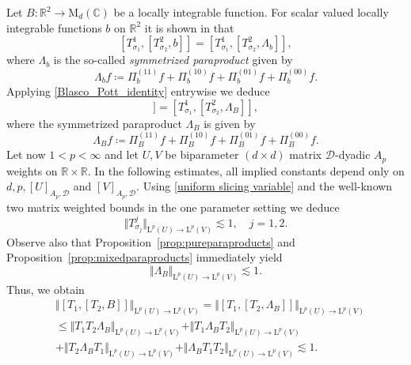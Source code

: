\documentclass{article}
\theoremstyle{definition}
\theoremstyle{remark}
\numberwithin{equation}{section}
\newcommand{\bfD}{\bm{\mathcal{D}}}
\newcommand{\reals}{\mathbb{R}}
\newcommand{\complex}{\mathbb{C}}
\newcommand{\Lp}[1]{\mathrm{L}^{#1}}
\newcommand{\1}{\mathbf{1}}
\begin{document}
    Let $B:\reals^{2}\to \mathrm{M}_{d}(\complex)$ be a locally integrable function. For scalar valued locally integrable functions $b$ on $\reals^2$ it is shown in \cite{Blasco_Pott_2005} that
    \begin{equation}
        \label{Blasco_Pott_identity}
        [T^1_{\sigma_1},[T^2_{\sigma_2},b]] = [T^1_{\sigma_1},[T^2_{\sigma_2},\Lambda_{b}]],
    \end{equation}
    where $\Lambda_{b}$ is the so-called \emph{symmetrized paraproduct} given by
    \begin{equation*}
        \Lambda_{b}f \coloneq  \Pi^{(11)}_{b}f+\Pi^{(10)}_{b}f+\Pi^{(01)}_{b}f+\Pi^{(00)}_{b}f.
    \end{equation*}
    Applying \eqref{Blasco_Pott_identity} entrywise we deduce
    \begin{equation*}
        [T^1_{\sigma_1},[T^2_{\sigma_2},B]] = [T^1_{\sigma_1},[T^2_{\sigma_2},\Lambda_{B}]],
    \end{equation*}
    where the symmetrized paraproduct $\Lambda_{B}$ is given by
    \begin{equation*}
        \Lambda_{B}f \coloneq  \Pi^{(11)}_{B}f+\Pi^{(10)}_{B}f+\Pi^{(01)}_{B}f+\Pi^{(00)}_{B}f.
    \end{equation*}
    Let now $1<p<\infty$ and let $U,V$ be biparameter $(d\times d)$ matrix $\bfD$-dyadic $A_p$ weights on $\reals\times\reals.$ In the following estimates, all implied constants depend only on $d,p,[U]_{A_p,\bfD}$ and $[V]_{A_p,\bfD}.$ Using \eqref{uniform slicing variable} and the well-known two matrix weighted bounds in the one parameter setting \cite{Cruz_Uribe_OFS_2018} we deduce
    \begin{equation*}
        \Vert T^{j}_{\sigma_{j}}\Vert_{\Lp{p}(U)\to \Lp{p}(V)}\lesssim1,\quad j=1,2.
    \end{equation*}
    Observe also that Proposition~\ref{prop:pureparaproducts} and Proposition~\ref{prop:mixedparaproducts} immediately yield
    \begin{equation*}
    \Vert\Lambda_{B}\Vert_{\Lp{p}(U)\to \Lp{p}(V)}\lesssim1.
    \end{equation*}
    Thus, we obtain
    \begin{align*}
        &\Vert[T_1,[T_2,B]]\Vert_{\Lp{p}(U)\to \Lp{p}(V)} = \Vert[T_1,[T_2,\Lambda_{B}]]\Vert_{\Lp{p}(U)\to \Lp{p}(V)}\\
        &\leq\Vert T_1T_2\Lambda_{B}\Vert_{\Lp{p}(U)\to \Lp{p}(V)}+\Vert T_1\Lambda_{B}T_2\Vert_{\Lp{p}(U)\to \Lp{p}(V)}\\
        &+\Vert T_2\Lambda_{B}T_1\Vert_{\Lp{p}(U)\to \Lp{p}(V)}+\Vert\Lambda_{B}T_1T_2\Vert_{\Lp{p}(U)\to \Lp{p}(V)}\lesssim1.
    \end{align*}
\end{document}

